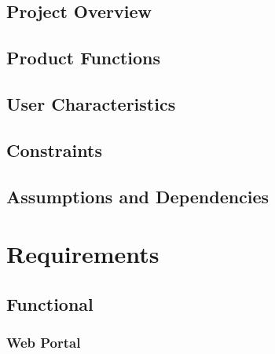 \documentclass[11pt,a4paper]{article}
\begin{document}
\subsection{Project Overview}
\label{sec:project-overview}


\subsection{Product Functions}
\label{sec:product-functions}


\subsection{User Characteristics}
\label{sec:user-characteristics}


\subsection{Constraints}
\label{sec:constraints}


\subsection{Assumptions and Dependencies}
\label{sec:assumptions-dependencies}

\section{Requirements}
\label{sec:requirements}
\subsection{Functional}
\label{sec:func-reqs}
\subsubsection{Web Portal}
\label{sec:req-reg-login}
\end{document}
